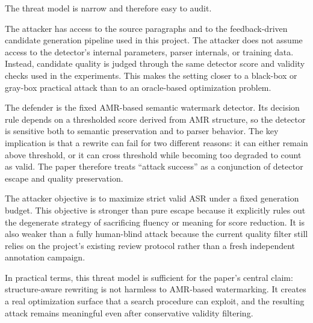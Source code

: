 The threat model is narrow and therefore easy to audit.

The attacker has access to the source paragraphs and to the feedback-driven candidate generation pipeline used in this project. The attacker does not assume access to the detector's internal parameters, parser internals, or training data. Instead, candidate quality is judged through the same detector score and validity checks used in the experiments. This makes the setting closer to a black-box or gray-box practical attack than to an oracle-based optimization problem.

The defender is the fixed AMR-based semantic watermark detector. Its decision rule depends on a thresholded score derived from AMR structure, so the detector is sensitive both to semantic preservation and to parser behavior. The key implication is that a rewrite can fail for two different reasons: it can either remain above threshold, or it can cross threshold while becoming too degraded to count as valid. The paper therefore treats ``attack success'' as a conjunction of detector escape and quality preservation.

The attacker objective is to maximize strict valid ASR under a fixed generation budget. This objective is stronger than pure escape because it explicitly rules out the degenerate strategy of sacrificing fluency or meaning for score reduction. It is also weaker than a fully human-blind attack because the current quality filter still relies on the project's existing review protocol rather than a fresh independent annotation campaign.

In practical terms, this threat model is sufficient for the paper's central claim: structure-aware rewriting is not harmless to AMR-based watermarking. It creates a real optimization surface that a search procedure can exploit, and the resulting attack remains meaningful even after conservative validity filtering.
